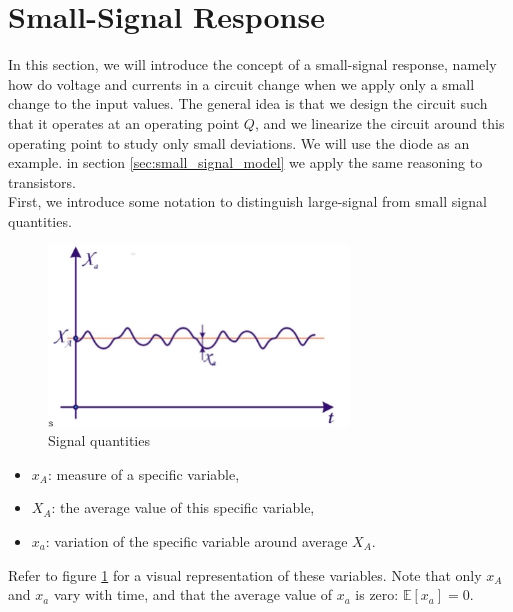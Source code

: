\section{Small-Signal Response}
\label{sec:small_signal_response}
In this section, we will introduce the concept of a small-signal response, namely how do voltage and currents in a circuit change when we apply only a small change to the input values. The general idea is that we design the circuit such that it operates at an operating point $Q$, and we linearize the circuit around this operating point to study only small deviations. We will use the diode as an example. in section \ref{sec:small_signal_model} we apply the same reasoning to transistors.\\
First, we introduce some notation to distinguish large-signal from small signal quantities. 

\begin{figure}[h!]
	\centering
	\includegraphics[width=8cm]{figures/ch02/small_signal_resp1.jpg}
	\caption{Signal quantities}
	\label{fig:small_signal_resp1}
\end{figure}

\begin{itemize}
	\item $x_A$: measure of a specific variable,
	\item $X_A$: the average value of this specific variable,
	\item $x_a$: variation of the specific variable around average $X_A$.
\end{itemize}
Refer to figure \ref{fig:small_signal_resp1} for a visual representation of these variables. Note that only $x_A$ and $x_a$ vary with time, and that the average value of $x_a$ is zero: $\mathds{E}[x_a] = 0$.

